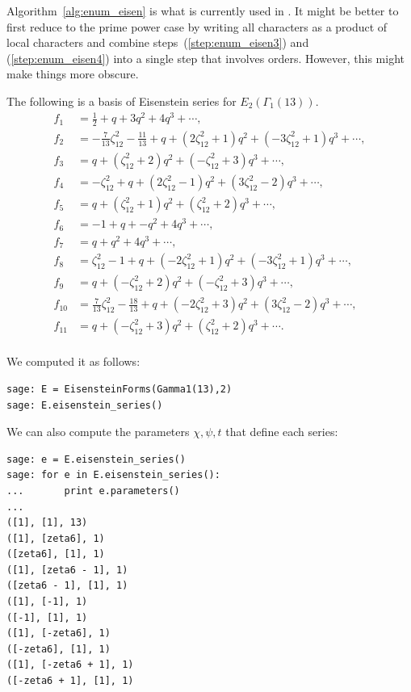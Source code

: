 \begin{remark}
Algorithm~\ref{alg:enum_eisen} is what is currently used in \sage.
It might be better to first reduce to the prime power case by writing
all characters as a product of local characters and combine
steps~(\ref{step:enum_eisen3}) and (\ref{step:enum_eisen4}) into a single
step that involves orders.  However, this might make things more
obscure.
\end{remark}
\begin{example}
The following is a basis of Eisenstein series 
for $E_2(\Gamma_1(13))$.
\begin{align*}
f_{1} &= \frac{1}{2} + q + 3q^{2} + 4q^{3} + \cdots,\\
f_{2} &= -\frac{7}{13}\zeta_{12}^{2} - \frac{11}{13} + q + \left(2\zeta_{12}^{2} + 1\right)q^{2} + \left(-3\zeta_{12}^{2} + 1\right)q^{3} + \cdots,\\
f_{3} &= q + \left(\zeta_{12}^{2} + 2\right)q^{2} + \left(-\zeta_{12}^{2} + 3\right)q^{3} + \cdots,\\
f_{4} &= -\zeta_{12}^{2} + q + \left(2\zeta_{12}^{2} - 1\right)q^{2} + \left(3\zeta_{12}^{2} - 2\right)q^{3} + \cdots,\\
f_{5} &= q + \left(\zeta_{12}^{2} + 1\right)q^{2} + \left(\zeta_{12}^{2} + 2\right)q^{3} + \cdots,\\
f_{6} &= -1 + q + -q^{2} + 4q^{3} + \cdots,\\
f_{7} &= q + q^{2} + 4q^{3} + \cdots,\\
f_{8} &= \zeta_{12}^{2} - 1 + q + \left(-2\zeta_{12}^{2} + 1\right)q^{2} + \left(-3\zeta_{12}^{2} + 1\right)q^{3} + \cdots,\\
f_{9} &= q + \left(-\zeta_{12}^{2} + 2\right)q^{2} + \left(-\zeta_{12}^{2} + 3\right)q^{3} + \cdots,\\
f_{10} &= \frac{7}{13}\zeta_{12}^{2} - \frac{18}{13} + q + \left(-2\zeta_{12}^{2} + 3\right)q^{2} + \left(3\zeta_{12}^{2} - 2\right)q^{3} + \cdots,\\
f_{11} &= q + \left(-\zeta_{12}^{2} + 3\right)q^{2} + \left(\zeta_{12}^{2} + 2\right)q^{3} + \cdots.\\
\end{align*}

We computed it as follows:
\begin{verbatim}
sage: E = EisensteinForms(Gamma1(13),2)
sage: E.eisenstein_series()
\end{verbatim}%

We can also compute the parameters $\chi,\psi,t$ that
define each series:
\begin{verbatim}
sage: e = E.eisenstein_series()
sage: for e in E.eisenstein_series():
...       print e.parameters()
...
([1], [1], 13)
([1], [zeta6], 1)
([zeta6], [1], 1)
([1], [zeta6 - 1], 1)
([zeta6 - 1], [1], 1)
([1], [-1], 1)
([-1], [1], 1)
([1], [-zeta6], 1)
([-zeta6], [1], 1)
([1], [-zeta6 + 1], 1)
([-zeta6 + 1], [1], 1)
\end{verbatim}

\end{example}

